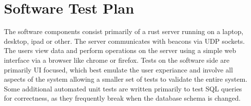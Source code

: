 

\setcounter{section}{4}
\section{Software Test Plan}
\bigskip

The software components consist primarily of a rust server running on a laptop, desktop, ipad or other.
The server communicates with beacons via UDP sockets.
The users view data and perform operations on the server using a simple web interface via a browser like chrome or firefox.
Tests on the software side are primarily UI focused, which best emulate the user experiance and involve all aspects of the system allowing a smaller set of tests to validate the entire system.
Some additional automated unit tests are written primarily to test SQL queries for correctness, as they frequently break when the database schema is changed.

